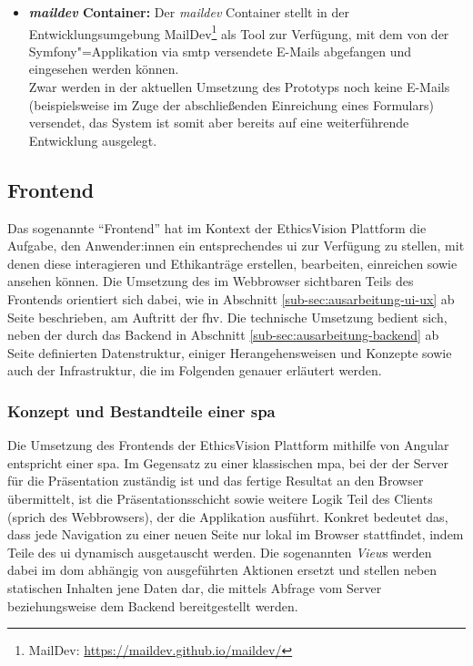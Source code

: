 \documentclass[a4paper,12pt,twoside]{scrreprt}
\begin{document}
\begin{itemize}
    \item \textbf{\textit{maildev} Container:} Der \textit{maildev} Container stellt in der Entwicklungsumgebung MailDev\footnote{MailDev: \url{https://maildev.github.io/maildev/}} als Tool zur Verfügung, mit dem von der Symfony"=Applikation via \ac{smtp} versendete E-Mails abgefangen und eingesehen werden können.\\
    Zwar werden in der aktuellen Umsetzung des Prototyps noch keine E-Mails (beispielsweise im Zuge der abschließenden Einreichung eines Formulars) versendet, das System ist somit aber bereits auf eine weiterführende Entwicklung ausgelegt.
\end{itemize}

\subsection{Frontend}
\label{sub-sec:ausarbeitung-frontend}

Das sogenannte \enquote{Frontend} hat im Kontext der EthicsVision Plattform die Aufgabe, den Anwender:innen ein entsprechendes \acl{ui} zur Verfügung zu stellen, mit denen diese interagieren und Ethikanträge erstellen, bearbeiten, einreichen sowie ansehen können. Die Umsetzung des im Webbrowser sichtbaren Teils des Frontends orientiert sich dabei, wie in Abschnitt \ref{sub-sec:ausarbeitung-ui-ux} ab Seite \pageref{sub-sec:ausarbeitung-ui-ux} beschrieben, am Auftritt der \acl{fhv}. Die technische Umsetzung bedient sich, neben der durch das Backend in Abschnitt \ref{sub-sec:ausarbeitung-backend} ab Seite \pageref{sub-sec:ausarbeitung-backend} definierten Datenstruktur, einiger Herangehensweisen und Konzepte sowie auch der Infrastruktur, die im Folgenden genauer erläutert werden.

\subsubsection*{Konzept und Bestandteile einer \acl{spa}}
\label{sub-sub-sec:konzept-bestandteile-spa}

Die Umsetzung des Frontends der EthicsVision Plattform mithilfe von Angular entspricht einer \acl{spa}. Im Gegensatz zu einer klassischen \ac{mpa}, bei der der Server für die Präsentation zuständig ist und das fertige Resultat an den Browser übermittelt, ist die Präsentationsschicht sowie weitere Logik Teil des Clients (sprich des Webbrowsers), der die Applikation ausführt. Konkret bedeutet das, dass jede Navigation zu einer neuen Seite nur lokal im Browser stattfindet, indem Teile des \ac{ui} dynamisch ausgetauscht werden. Die sogenannten \textit{View}s werden dabei im \ac{dom} abhängig von ausgeführten Aktionen ersetzt und stellen neben statischen Inhalten jene Daten dar, die mittels Abfrage vom Server beziehungsweise dem Backend bereitgestellt werden. \cite[5\psqq]{scott_spa_2015}
\end{document}
